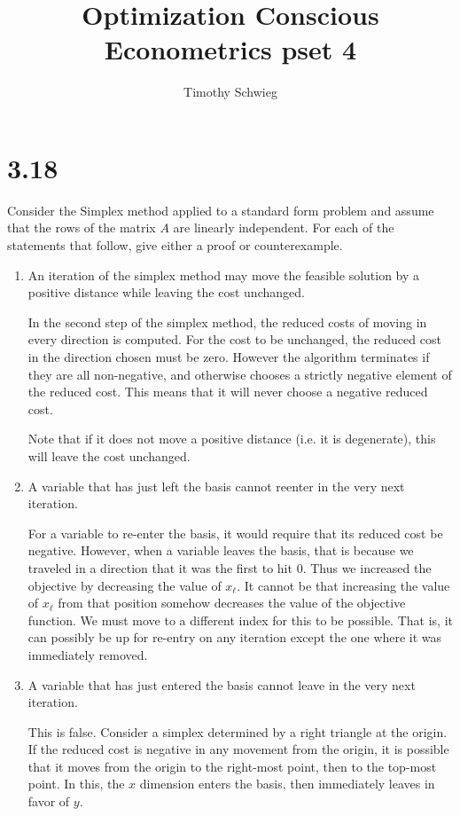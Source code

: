 \documentclass[12pt]{paper}
\title{Optimization Conscious Econometrics pset 4}
\author{Timothy Schwieg}
\begin{document}
\maketitle

\section{3.18}

Consider the Simplex method applied to a standard form problem and
assume that the rows of the matrix $A$ are linearly independent. For
each of the statements that follow, give either a proof or
counterexample.


\begin{enumerate}
\item An iteration of the simplex method may move the feasible
  solution by a positive distance while leaving the cost unchanged.

  \vspace{.15in}
  
  In the second step of the simplex method, the reduced costs of
  moving in every direction is computed. For the cost to be unchanged,
  the reduced cost in the direction chosen must be zero. However the
  algorithm terminates if they are all non-negative, and otherwise
  chooses a strictly negative element of the reduced cost. This means
  that it will never choose a negative reduced cost.

  Note that if it does not move a positive distance (i.e. it is
  degenerate), this will leave the cost unchanged.

\item A variable that has just left the basis cannot reenter in the
  very next iteration.

  \vspace{.15in}
For a variable to re-enter the basis, it would require that its
reduced cost be negative. However, when a variable leaves the basis,
that is because we traveled in a direction that it was the first to
hit $0$. Thus we increased the objective by decreasing the value of
$x_{\ell}$. It cannot be that increasing the value of $x_{\ell}$ from that
position somehow decreases the value of the objective function. We
must move to a different index for this to be possible.  That is, it
can possibly be up for re-entry on any iteration except the one where
it was immediately removed. 

  
  
\item A variable that has just entered the basis cannot leave in the
  very next iteration.

  \vspace{.15in}

  This is false. Consider a simplex determined by a right triangle at
  the origin. If the reduced cost is negative in any movement from the
  origin, it is possible that it moves from the origin to the
  right-most point, then to the top-most point. In this, the $x$
  dimension enters the basis, then immediately leaves in favor of $y$.
  
  
\end{enumerate}
\end{document}
